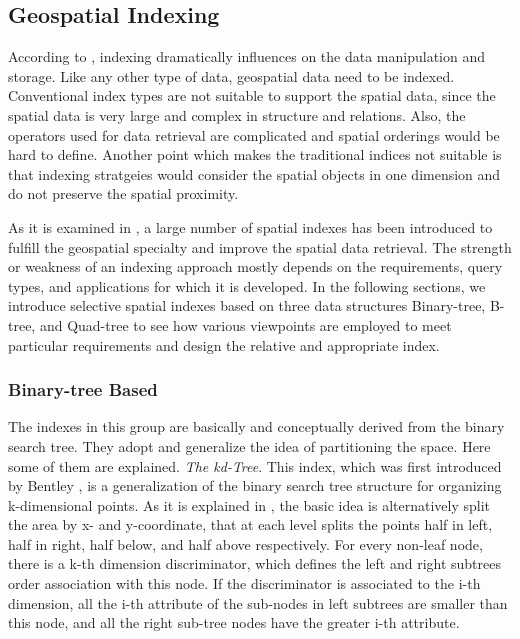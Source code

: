 \documentclass[a4paper,12pt]{article}
\begin{document}
\subsection{Geospatial Indexing}
\label{s.geospatial-index}
According to \cite{survey}, indexing dramatically influences on the data manipulation and storage. Like any other type of data, geospatial data need to be indexed. Conventional index types are not suitable to support the spatial data, since the spatial data is very large and complex in structure and relations. Also, the operators used for data retrieval are complicated and spatial orderings would be hard to define. Another point which makes the traditional indices not suitable is that indexing stratgeies would consider the spatial objects in one dimension and do not preserve the spatial proximity.

As it is examined in \cite{survey}, a large number of spatial indexes has been introduced to fulfill the geospatial specialty and improve the spatial data retrieval. The strength or weakness of an indexing approach mostly depends on the requirements, query types, and applications for which it is developed. In the following sections, we introduce selective spatial indexes based on three data structures Binary-tree, B-tree, and Quad-tree to see how various viewpoints are employed to meet particular requirements and design the relative and appropriate index.

\subsubsection{Binary-tree Based}
The indexes in this group are basically and conceptually derived from the binary search tree. They adopt and generalize the idea of partitioning the space. Here some of them are explained.
\emph{The kd-Tree}.
This index, which was first introduced by Bentley \cite{bently1975}, is a generalization of the binary search tree structure for organizing k-dimensional points. As it is explained in \cite{bently1975}, the basic idea is alternatively split the area by x- and y-coordinate, that at each level splits the points half in left, half in right, half below, and half above respectively. For every non-leaf node, there is a k-th dimension discriminator, which defines the left and right subtrees order association with this node. If the discriminator is associated to the i-th dimension, all the i-th attribute of the sub-nodes in left subtrees are smaller than this node, and all the right sub-tree nodes have the greater i-th attribute.
\end{document}
